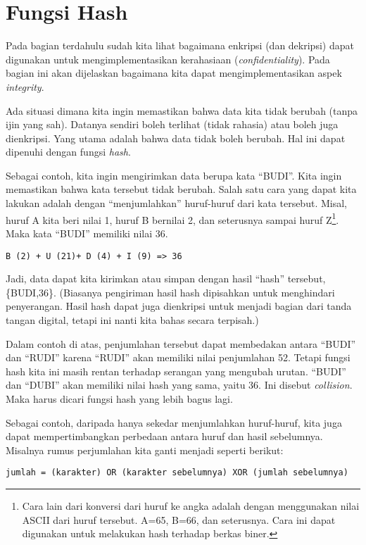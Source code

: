 \section{Fungsi Hash}
Pada bagian terdahulu sudah kita lihat bagaimana enkripsi (dan dekripsi) dapat digunakan untuk mengimplementasikan kerahasiaan ({\em confidentiality}). Pada bagian ini akan dijelaskan bagaimana kita dapat mengimplementasikan aspek {\em integrity}.

Ada situasi dimana kita ingin memastikan bahwa data kita tidak berubah (tanpa ijin yang sah). Datanya sendiri boleh terlihat (tidak rahasia) atau boleh juga dienkripsi. Yang utama adalah bahwa data tidak boleh berubah. Hal ini dapat dipenuhi dengan fungsi {\em hash}.

Sebagai contoh, kita ingin mengirimkan data berupa kata ``BUDI''. Kita ingin memastikan bahwa kata tersebut tidak berubah. Salah satu cara yang dapat kita lakukan adalah dengan ``menjumlahkan'' huruf-huruf dari kata tersebut. Misal, huruf A kita beri nilai 1, huruf B bernilai 2, dan seterusnya sampai huruf Z\footnote{Cara lain dari konversi dari huruf ke angka adalah dengan menggunakan nilai ASCII dari huruf tersebut. A=65, B=66, dan seterusnya. Cara ini dapat digunakan untuk melakukan hash terhadap berkas biner.}. Maka kata ``BUDI'' memiliki nilai 36.

\begin{verbatim}
B (2) + U (21)+ D (4) + I (9) => 36
\end{verbatim}

Jadi, data dapat kita kirimkan atau simpan dengan hasil ``hash'' tersebut, \{BUDI,36\}. (Biasanya pengiriman hasil hash dipisahkan untuk menghindari penyerangan. Hasil hash dapat juga dienkripsi untuk menjadi bagian dari tanda tangan digital, tetapi ini nanti kita bahas secara terpisah.)

Dalam contoh di atas, penjumlahan tersebut dapat membedakan antara ``BUDI'' dan ``RUDI'' karena ``RUDI'' akan memiliki nilai penjumlahan 52. Tetapi fungsi hash kita ini masih rentan terhadap serangan yang mengubah urutan. ``BUDI'' dan ``DUBI'' akan memiliki nilai hash yang sama, yaitu 36. Ini disebut {\em collision}. Maka harus dicari fungsi hash yang lebih bagus lagi.

Sebagai contoh, daripada hanya sekedar menjumlahkan huruf-huruf, kita juga dapat mempertimbangkan perbedaan antara huruf dan hasil sebelumnya. Misalnya rumus perjumlahan kita ganti menjadi seperti berikut:

\begin{verbatim}
jumlah = (karakter) OR (karakter sebelumnya) XOR (jumlah sebelumnya)
\end{verbatim}

